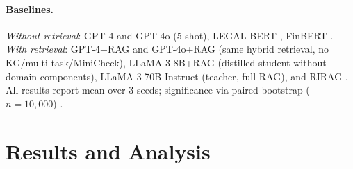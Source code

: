 \documentclass[11pt]{article}
\begin{document}
\paragraph{Baselines.} \emph{Without retrieval}: GPT-4 and GPT-4o (5-shot), LEGAL-BERT \citep{chalkidis2020legalbert}, FinBERT \citep{araci2019finbert}. \emph{With retrieval}: GPT-4+RAG and GPT-4o+RAG (same hybrid retrieval, no KG/multi-task/MiniCheck), LLaMA-3-8B+RAG (distilled student without domain components), LLaMA-3-70B-Instruct (teacher, full RAG), and RIRAG \citep{gokhan2025regnlp}. All results report mean over 3 seeds; significance via paired bootstrap ($n{=}10{,}000$) \citep{koehn2004bootstrap}.


\section{Results and Analysis}
\label{sec:results}
\end{document}
